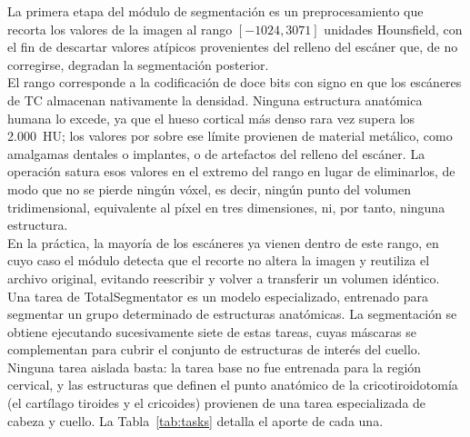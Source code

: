 La primera etapa del módulo de segmentación es un preprocesamiento que recorta los valores de la imagen al rango $[-1024, 3071]$ unidades Hounsfield, con el fin de descartar valores atípicos provenientes del relleno del escáner que, de no corregirse, degradan la segmentación posterior.\\

El rango corresponde a la codificación de doce bits con signo en que los escáneres de TC almacenan nativamente la densidad. Ninguna estructura anatómica humana lo excede, ya que el hueso cortical más denso rara vez supera los 2.000~HU; los valores por sobre ese límite provienen de material metálico, como amalgamas dentales o implantes, o de artefactos del relleno del escáner. La operación satura esos valores en el extremo del rango en lugar de eliminarlos, de modo que no se pierde ningún vóxel, es decir, ningún punto del volumen tridimensional, equivalente al píxel en tres dimensiones, ni, por tanto, ninguna estructura.\\

En la práctica, la mayoría de los escáneres ya vienen dentro de este rango, en cuyo caso el módulo detecta que el recorte no altera la imagen y reutiliza el archivo original, evitando reescribir y volver a transferir un volumen idéntico.\\

Una tarea de TotalSegmentator es un modelo especializado, entrenado para segmentar un grupo determinado de estructuras anatómicas. La segmentación se obtiene ejecutando sucesivamente siete de estas tareas, cuyas máscaras se complementan para cubrir el conjunto de estructuras de interés del cuello. Ninguna tarea aislada basta: la tarea base no fue entrenada para la región cervical, y las estructuras que definen el punto anatómico de la cricotiroidotomía (el cartílago tiroides y el cricoides) provienen de una tarea especializada de cabeza y cuello. La Tabla~\ref{tab:tasks} detalla el aporte de cada una.\\

